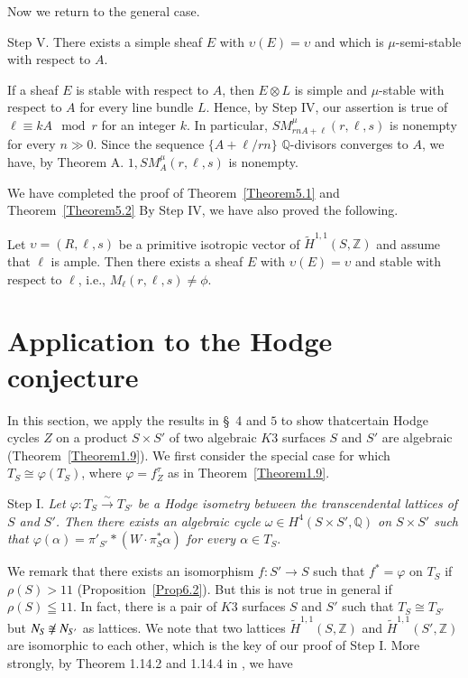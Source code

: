 Now we return to the general case.

Step V. There exists a simple sheaf $E$ with $\upsilon(E)=\upsilon$
and which is $\mu$-semi-stable with respect to $A$. 


\begin{Proof}
If a sheaf $E$ is stable with respect to $A$, then $E\otimes L$ is
simple and $\mu$-stable with respect to $A$ for every line bundle
$L$. Hence, by Step IV, our assertion is true of $\ell\equiv k A \mod
r$  for an integer $k$. In particular, $SM^{\mu}_{rn A+\ell}(r,\ell,
s)$ is nonempty for every $n\gg 0$. Since the sequence $\{A+\ell/rn\}$
$\mathbb{Q}$-divisors converges to $A$, we have, by Theorem A. $1,
SM^{\mu}_A(r,\ell, s)$ is nonempty.
\enprf
\end{Proof}

We have completed the proof of Theorem~\ref{Theorem5.1} and
Theorem~\ref{Theorem5.2} By Step IV, we have also proved the
following. 


\begin{Theorem}\label{Theorem5.4}
Let $\upsilon=(R,\ell,s)$ be a primitive isotropic vector of\break
$\widetilde{H}^{1,1}(S,\mathbb{Z})$ and assume that $\ell$ is
ample. Then there exists a sheaf $E$ with $\upsilon(E)=\upsilon$ and
stable with respect to $\ell$, i.e., $M_{\ell}(r,\ell,s)\neq \phi$.
\end{Theorem}

\section{Application to the Hodge conjecture}\label{s6}

In this section, we apply the results in \S\ 4 and $5$ to show
that\pageoriginale certain Hodge cycles $Z$ on a product $S\times S'$ of two
algebraic $K3$ surfaces $S$ and $S'$ are algebraic
(Theorem~\ref{Theorem1.9}). We first consider the special case for
which $T_S\cong \varphi(T_S)$, where $\varphi=f^{\tau}_Z$ as in
Theorem~\ref{Theorem1.9}.

Step I. \textit{Let $\varphi:T_S\xrightarrow{\sim} T_{S'}$ be a Hodge
isometry between the transcendental lattices of $S$ and $S'$. Then
there exists an algebraic cycle $\omega \in H^{4}(S\times S', \mathbb{Q})$ on
$S\times S'$ such that
$\varphi(\alpha)=\pi'_{S'}\ast(W\cdot \pi_S^{\ast}\alpha)$ for every
$\alpha \in T_S$}. 

We remark that there exists an isomorphism $f:S'\to S$ such that
$f^{\ast}=\varphi$ on $T_S$ if $\rho(S)>11$
(Proposition~\ref{Prop6.2}). But this is not true in general if
$\rho(S)\leqq 11$. In fact, there is a pair of $K3$ surfaces $S$ and
$S'$ such that $T_S\cong T_{S'}$ but $N_S\not\kern-1pt\cong N_{S'}$ as lattices. We
note that two lattices $\widetilde{H}^{1,1}(S,\mathbb{Z})$ and
$\widetilde{H}^{1,1}(S',\mathbb{Z})$ are isomorphic to each other,
which is the key of our proof of  Step I. More  strongly, by Theorem
1.14.2 and 1.14.4 in \cite{key17}, we have 

